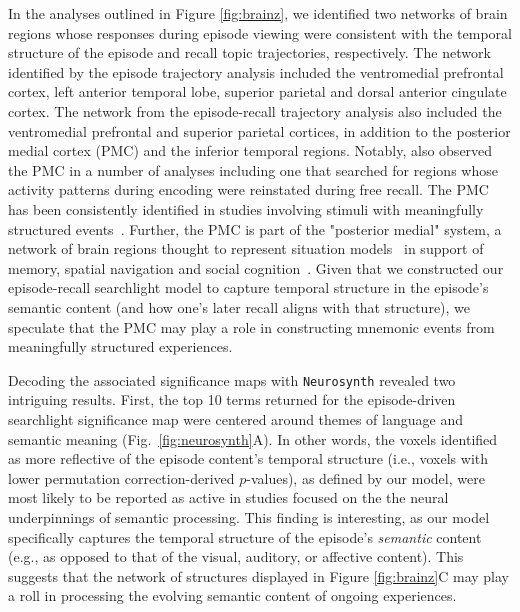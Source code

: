 \documentclass{article}
\begin{document}
In the analyses outlined in Figure \ref{fig:brainz}, we identified two networks of brain regions whose responses during episode viewing were consistent with the temporal structure of the episode and recall topic trajectories, respectively. The network identified by the episode trajectory analysis included the ventromedial prefrontal cortex, left anterior temporal lobe, superior parietal and dorsal anterior cingulate cortex. The network from the episode-recall trajectory analysis also included the ventromedial prefrontal and superior parietal cortices, in addition to the posterior medial cortex (PMC) and the inferior temporal regions. Notably, \cite{ChenEtal17} also observed the PMC in a number of analyses including one that searched for regions whose activity patterns during encoding were reinstated during free recall. The PMC has been consistently identified in studies involving stimuli with meaningfully structured events~\citep{CohnRang17}. Further, the PMC is part of the "posterior medial" system, a network of brain regions thought to represent situation models~\citep{ZackEtal07} in support of memory, spatial navigation and social cognition~\citep{RangRitc12}. Given that we constructed our episode-recall searchlight model to capture temporal structure in the episode's semantic content (and how one's later recall aligns with that structure), we speculate that the PMC may play a role in constructing mnemonic events from meaningfully structured experiences.

Decoding the associated significance maps with \texttt{Neurosynth} revealed two intriguing results.  First, the top 10 terms returned for the episode-driven searchlight significance map were centered around themes of language and semantic meaning (Fig.~\ref{fig:neurosynth}A).  In other words, the voxels identified as more reflective of the episode content's temporal structure (i.e., voxels with lower permutation correction-derived $p$-values), as defined by our model, were most likely to be reported as active in studies focused on the the neural underpinnings of semantic processing.  This finding is interesting, as our model specifically captures the temporal structure of the episode's \textit{semantic} content (e.g., as opposed to that of the visual, auditory, or affective content).  This suggests that the network of structures displayed in Figure \ref{fig:brainz}C may play a roll in processing the evolving semantic content of ongoing experiences.
\end{document}
